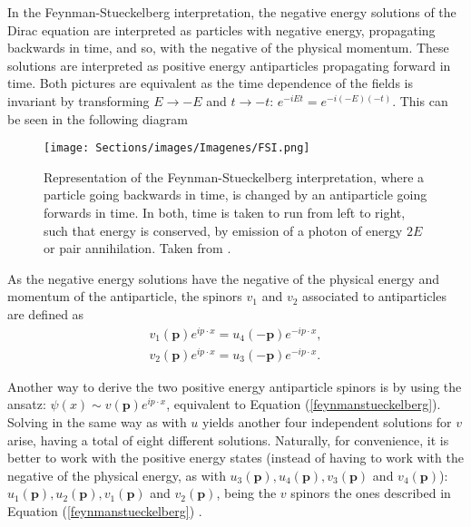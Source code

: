 In the Feynman-Stueckelberg interpretation, the negative energy solutions of the Dirac equation are interpreted as particles with negative energy, propagating backwards in time, and so, with the negative of the physical momentum. These solutions are interpreted as positive energy antiparticles propagating forward in time. Both pictures are equivalent as the time dependence of the fields is invariant by transforming $E\rightarrow -E$ and $t\rightarrow -t$: $e^{-iEt} = e^{-i(-E)(-t)}$. This can be seen in the following diagram

\begin{figure}[ht]
    \centering
    \texttt{[image: Sections/images/Imagenes/FSI.png]}
    \vspace{-1\baselineskip}
    \caption{Representation of the Feynman-Stueckelberg interpretation, where a particle going backwards in time, is changed by an antiparticle going forwards in time. In both, time is taken to run from left to right, such that energy is conserved, by emission of a photon of energy $2E$ or pair annihilation. Taken from \cite{Thomson}.}
    \label{im:feynstueck}
\end{figure}

As the negative energy solutions have the negative of the physical energy and momentum of the antiparticle, the spinors $v_1$ and $v_2$ associated to antiparticles are defined as
\begin{equation}
\label{feynmanstueckelberg}
\begin{gathered}
    v_1(\bm{p})e^{ip\cdot x} = u_4(-\bm{p})e^{-ip\cdot x}, \\
    v_2(\bm{p})e^{ip\cdot x} = u_3(-\bm{p})e^{-ip\cdot x}.
\end{gathered}
\end{equation}

Another way to derive the two positive energy antiparticle spinors is by using the ansatz: $\psi(x)\sim v(\bm{p})e^{ip\cdot x}$, equivalent to Equation (\ref{feynmanstueckelberg}). Solving in the same way as with $u$ yields another four independent solutions for $v$ arise, having a total of eight different solutions. Naturally, for convenience, it is better to work with the positive energy states (instead of having to work with the negative of the physical energy, as with $u_3(\bm{p}), u_4(\bm{p}), v_3(\bm{p})$ and $v_4(\bm{p})$): $u_1(\bm{p}),u_2(\bm{p}),v_1(\bm{p})$ and $v_2(\bm{p})$, being the $v$ spinors the ones described in Equation (\ref{feynmanstueckelberg}) \cite{Thomson}.

